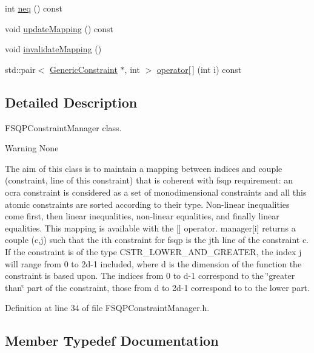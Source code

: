 \begin{DoxyCompactItemize}
\item 
int \hyperlink{classocra_1_1FSQPConstraintManager_a409c77e57544db480b0420acdfc7a1d6}{neq} () const
\item 
void \hyperlink{classocra_1_1FSQPConstraintManager_a1476ee24e4852fcc7f328b7aa3486c14}{update\+Mapping} () const
\item 
void \hyperlink{classocra_1_1FSQPConstraintManager_a54f055c7be78852480dbd3f5ba66656e}{invalidate\+Mapping} ()
\item 
std\+::pair$<$ \hyperlink{namespaceocra_af10341108ce661566aad00908668e2b1}{Generic\+Constraint} $\ast$, int $>$ \hyperlink{classocra_1_1FSQPConstraintManager_ac83ac27b5edd34aed935061ca72925eb}{operator\mbox{[}$\,$\mbox{]}} (int i) const
\end{DoxyCompactItemize}


\subsection{Detailed Description}
F\+S\+Q\+P\+Constraint\+Manager class. 

\begin{DoxyWarning}{Warning}
None
\end{DoxyWarning}
The aim of this class is to maintain a mapping between indices and couple (constraint, line of this constraint) that is coherent with fsqp requirement\+: an ocra constraint is considered as a set of monodimensional constraints and all this \textquotesingle{}atomic\textquotesingle{} constraints are sorted according to their type. Non-\/linear inequalities come first, then linear inequalities, non-\/linear equalities, and finally linear equalities. This mapping is available with the \mbox{[}\mbox{]} operator. manager\mbox{[}i\mbox{]} returns a couple (c,j) such that the ith constraint for fsqp is the jth line of the constraint c. If the constraint is of the type C\+S\+T\+R\+\_\+\+L\+O\+W\+E\+R\+\_\+\+A\+N\+D\+\_\+\+G\+R\+E\+A\+T\+ER, the index j will range from 0 to 2d-\/1 included, where d is the dimension of the function the constraint is based upon. The indices from 0 to d-\/1 correspond to the \char`\"{}greater than\char`\"{} part of the constraint, those from d to 2d-\/1 correspond to to the lower part. 

Definition at line 34 of file F\+S\+Q\+P\+Constraint\+Manager.\+h.



\subsection{Member Typedef Documentation}
\hypertarget{classocra_1_1FSQPConstraintManager_abe1cf7412d42b4a1b7158936a24ae6fb}{}\label{classocra_1_1FSQPConstraintManager_abe1cf7412d42b4a1b7158936a24ae6fb} 
